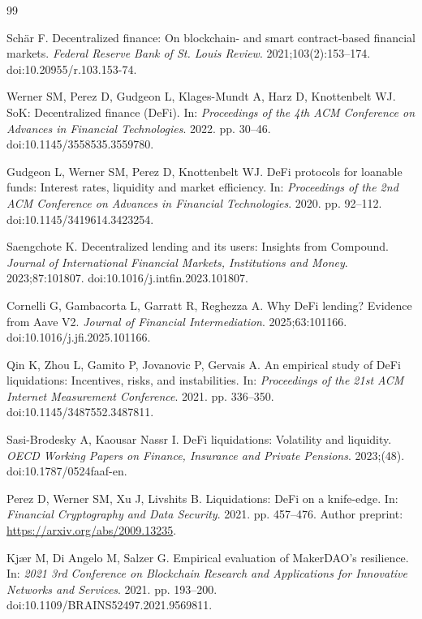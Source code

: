 \begin{thebibliography}{99}

Sch\"ar F.
Decentralized finance: On blockchain- and smart contract-based financial markets.
\textit{Federal Reserve Bank of St. Louis Review}. 2021;103(2):153--174.
doi:10.20955/r.103.153-74.

Werner SM, Perez D, Gudgeon L, Klages-Mundt A, Harz D, Knottenbelt WJ.
SoK: Decentralized finance (DeFi).
In: \textit{Proceedings of the 4th ACM Conference on Advances in Financial Technologies}. 2022. pp. 30--46.
doi:10.1145/3558535.3559780.

Gudgeon L, Werner SM, Perez D, Knottenbelt WJ.
DeFi protocols for loanable funds: Interest rates, liquidity and market efficiency.
In: \textit{Proceedings of the 2nd ACM Conference on Advances in Financial Technologies}. 2020. pp. 92--112.
doi:10.1145/3419614.3423254.

Saengchote K.
Decentralized lending and its users: Insights from Compound.
\textit{Journal of International Financial Markets, Institutions and Money}. 2023;87:101807.
doi:10.1016/j.intfin.2023.101807.

Cornelli G, Gambacorta L, Garratt R, Reghezza A.
Why DeFi lending? Evidence from Aave V2.
\textit{Journal of Financial Intermediation}. 2025;63:101166.
doi:10.1016/j.jfi.2025.101166.

Qin K, Zhou L, Gamito P, Jovanovic P, Gervais A.
An empirical study of DeFi liquidations: Incentives, risks, and instabilities.
In: \textit{Proceedings of the 21st ACM Internet Measurement Conference}. 2021. pp. 336--350.
doi:10.1145/3487552.3487811.

Sasi-Brodesky A, Kaousar Nassr I.
DeFi liquidations: Volatility and liquidity.
\textit{OECD Working Papers on Finance, Insurance and Private Pensions}. 2023;(48).
doi:10.1787/0524faaf-en.

Perez D, Werner SM, Xu J, Livshits B.
Liquidations: DeFi on a knife-edge.
In: \textit{Financial Cryptography and Data Security}. 2021. pp. 457--476.
Author preprint: \url{https://arxiv.org/abs/2009.13235}.

Kj{\ae}r M, Di Angelo M, Salzer G.
Empirical evaluation of MakerDAO's resilience.
In: \textit{2021 3rd Conference on Blockchain Research and Applications for Innovative Networks and Services}. 2021. pp. 193--200.
doi:10.1109/BRAINS52497.2021.9569811.


\end{thebibliography}

